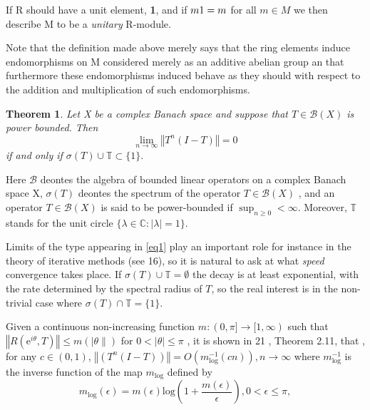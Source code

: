 \documentclass{article}
\newtheorem{thm}{Theorem}  %
\theoremstyle{definition}
\begin{document}
If R should have a unit element, \textbf{1}, and if $m\boldmath{1}=m$ for all $m\in M$ we then describe M to be a \textit{unitary} R-module. 

Note that the definition made above merely says that the ring elements induce endomorphisms on M considered merely as an additive abelian group an that furthermore these endomorphisms induced behave as they  should with respect to the addition and multiplication of such endomorphisms. 






















\begin{thm}
  Let X be a complex Banach space and suppose that $T\in \mathcal{B}(X)$ is power bounded. Then 
  \begin{equation} \label{eq1}
    \lim_{n \to \infty} \left\Vert T^n (I-T) \right\Vert =0
  \end{equation}
  if and only if $\sigma(T) \cup \mathbb{T} \subset \{1\}. $
\end{thm}

Here $\mathcal{B}$ deontes the algebra of bounded linear operators on a complex Banach space X, $\sigma(T)$ deontes the spectrum of the operator $T \in \mathcal{B}(X)$ , and an operator $T \in \mathcal{B}(X)$ is said to be power-bounded if $\sup_{n\geq 0}< \infty$. 
Moreover, $\mathbb{T}$ stands for the unit circle $\{\lambda \in \mathbb{C} : |\lambda | =1 \}$.

Limits of the type appearing in \ref{eq1} play an important role for instance in the theory of iterative methods (see 16), so it is natural to ask at what \textit{speed} convergence takes place. 
If $\sigma(T)\cup\mathbb{T}= \emptyset$ the decay is at least exponential, with the rate determined by the spectral radius of $T$, so the real interest is in the non-trivial case where $\sigma(T)\cap\mathbb{T}= \{1\}$.


Given a continuous non-increasing function 
$m : (0,\pi] \to [1,\infty )$ 
such that $\left\Vert R(\mathrm{e}^{i\theta}, T) \right\Vert \leq m(|\theta\|)$ 
for $0 < |\theta| \leq \pi$  , 
it is shown in 21 , Theorem 2.11, that , 
for any $c \in (0,1)$, 
$\left\Vert (T^n (I-T)) \right\Vert = O(m_\mathrm{log}^{-1}(cn)), n \to \infty $
where $m_\mathrm{log}^{-1}$ is the inverse function of the map $m_{\mathrm{log}}$ defined by 
\begin{equation}
  m_{\mathrm{log}}(\epsilon) = m(\epsilon) \mathrm{log} \left(1+ \frac{m(\epsilon)}{\epsilon} \right) , 0<\epsilon \leq \pi , 
\end{equation}
\end{document}
